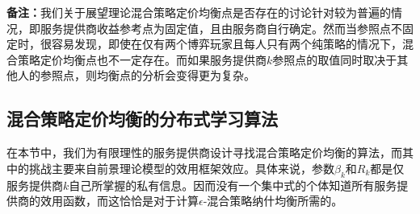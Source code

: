 \noindent\textbf{备注：}我们关于展望理论混合策略定价均衡点是否存在的讨论针对较为普遍的情况，即服务提供商收益参考点为固定值，且由服务商自行确定。然而当参照点不固定时，很容易发现，即使在仅有两个博弈玩家且每人只有两个纯策略的情况下，混合策略定价均衡点也不一定存在。而如果服务提供商$k$参照点的取值同时取决于其他人的参照点，则均衡点的分析会变得更为复杂。

\subsection{混合策略定价均衡的分布式学习算法}
在本节中，我们为有限理性的服务提供商设计寻找混合策略定价均衡的算法，而其中的挑战主要来自前景理论模型的效用框架效应。具体来说，参数$\beta_k$和$R_k$都是仅服务提供商$k$自己所掌握的私有信息。因而没有一个集中式的个体知道所有服务提供商的效用函数，而这恰恰是对于计算$\epsilon$-混合策略纳什均衡所需的。


